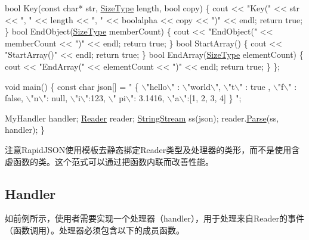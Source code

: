 \begin{DoxyCode}
    \textcolor{keywordtype}{bool} Key(\textcolor{keyword}{const} \textcolor{keywordtype}{char}* str, \hyperlink{rapidjson_8h_a5ed6e6e67250fadbd041127e6386dcb5}{SizeType} length, \textcolor{keywordtype}{bool} copy) \{ 
        cout << \textcolor{stringliteral}{"Key("} << str << \textcolor{stringliteral}{", "} << length << \textcolor{stringliteral}{", "} << boolalpha << copy << \textcolor{stringliteral}{")"} << endl;
        \textcolor{keywordflow}{return} \textcolor{keyword}{true};
    \}
    \textcolor{keywordtype}{bool} EndObject(\hyperlink{rapidjson_8h_a5ed6e6e67250fadbd041127e6386dcb5}{SizeType} memberCount) \{ cout << \textcolor{stringliteral}{"EndObject("} << memberCount << \textcolor{stringliteral}{")"} << endl; \textcolor{keywordflow}{
      return} \textcolor{keyword}{true}; \}
    \textcolor{keywordtype}{bool} StartArray() \{ cout << \textcolor{stringliteral}{"StartArray()"} << endl; \textcolor{keywordflow}{return} \textcolor{keyword}{true}; \}
    \textcolor{keywordtype}{bool} EndArray(\hyperlink{rapidjson_8h_a5ed6e6e67250fadbd041127e6386dcb5}{SizeType} elementCount) \{ cout << \textcolor{stringliteral}{"EndArray("} << elementCount << \textcolor{stringliteral}{")"} << endl; \textcolor{keywordflow}{
      return} \textcolor{keyword}{true}; \}
\};

\textcolor{keywordtype}{void} main() \{
    \textcolor{keyword}{const} \textcolor{keywordtype}{char} json[] = \textcolor{stringliteral}{" \{ \(\backslash\)"hello\(\backslash\)" : \(\backslash\)"world\(\backslash\)", \(\backslash\)"t\(\backslash\)" : true , \(\backslash\)"f\(\backslash\)" : false, \(\backslash\)"n\(\backslash\)": null, \(\backslash\)"i\(\backslash\)":123, \(\backslash\)"
      pi\(\backslash\)": 3.1416, \(\backslash\)"a\(\backslash\)":[1, 2, 3, 4] \} "};

    MyHandler handler;
    \hyperlink{class_generic_reader}{Reader} reader;
    \hyperlink{struct_generic_string_stream}{StringStream} ss(json);
    reader.\hyperlink{class_generic_reader_a0c450620d14ff1824e58bb7bd9b42099}{Parse}(ss, handler);
\}
\end{DoxyCode}


注意\+Rapid\+J\+S\+O\+N使用模板去静态挷定{\ttfamily Reader}类型及处理器的类形，而不是使用含虚函数的类。这个范式可以通过把函数内联而改善性能。\hypertarget{md_Commun_Externe_RapidJSON_doc_sax.zh-cn_Handler}{}\subsection{Handler}\label{md_Commun_Externe_RapidJSON_doc_sax.zh-cn_Handler}
如前例所示，使用者需要实现一个处理器（handler），用于处理来自{\ttfamily Reader}的事件（函数调用）。处理器必须包含以下的成员函数。


